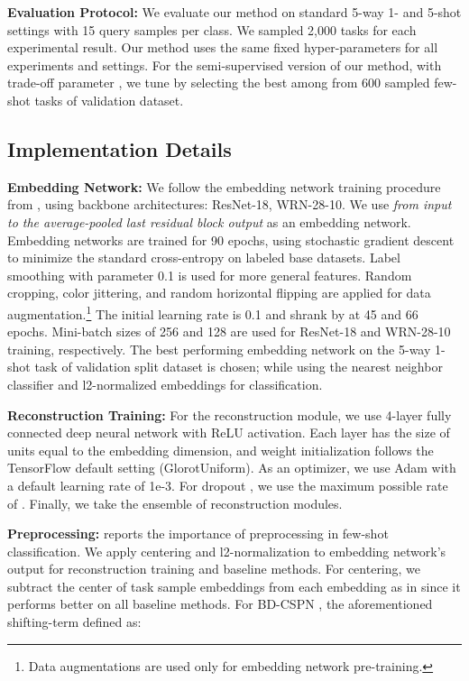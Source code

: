 \documentclass{article}
\begin{document}
\textbf{Evaluation Protocol:}
We evaluate our method on standard 5-way 1- and 5-shot settings with 15 query samples per class. We sampled 2,000 tasks for each experimental result. Our method uses the same fixed hyper-parameters for all experiments and settings. For the semi-supervised version of our method, with trade-off parameter , we tune  by selecting the best among  from 600 sampled few-shot tasks of validation dataset.


\subsection{Implementation Details}
\label{implementation_detail}
\textbf{Embedding Network:}
We follow the embedding network training procedure from \citet{LaplacianShot}, using backbone architectures: ResNet-18, WRN-28-10. We use \textit{from input to the average-pooled last residual block output} as an embedding network. Embedding networks are trained for 90 epochs, using stochastic gradient descent to minimize the standard cross-entropy on labeled base datasets. Label smoothing with parameter 0.1 is used for more general features. Random cropping, color jittering, and random horizontal flipping are applied for data augmentation.\footnote{Data augmentations are used only for embedding network pre-training.} The initial learning rate is 0.1 and shrank by  at 45 and 66 epochs. Mini-batch sizes of 256 and 128 are used for ResNet-18 and WRN-28-10 training, respectively. The best performing embedding network on the 5-way 1-shot task of validation split dataset is chosen; while using the nearest neighbor classifier and l2-normalized embeddings for classification.

\textbf{Reconstruction Training:}
For the reconstruction module, we use 4-layer fully connected deep neural network with ReLU activation. Each layer has the size of units equal to the embedding dimension, and weight initialization follows the TensorFlow \cite{abadi2016tensorflow} default setting (GlorotUniform). As an optimizer, we use Adam \cite{kingma2014adam} with a default learning rate of 1e-3. For dropout \cite{dropout}, we use the maximum possible rate of . Finally, we take the ensemble of  reconstruction modules.

\textbf{Preprocessing:}
\citet{SimpleShot} reports the importance of preprocessing in few-shot classification. We apply centering and l2-normalization to embedding network's output for reconstruction training and baseline methods. For centering, we subtract the center of task sample embeddings from each embedding as in \citet{TAFSSL} since it performs better on all baseline methods. For BD-CSPN \cite{BDCSPN}, the aforementioned shifting-term defined as:
\end{document}
